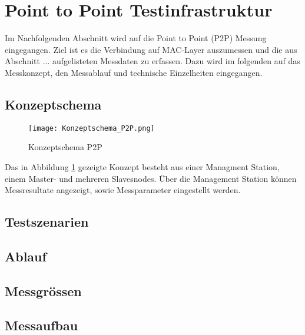 \clearpage
\section{Point to Point Testinfrastruktur}\label{sec:PointtoPointTestinfrastruktur}

Im Nachfolgenden Abschnitt wird auf die Point to Point (P2P) Messung eingegangen. Ziel ist es die Verbindung auf MAC-Layer auszumessen und die aus Abschnitt ... aufgelisteten Messdaten zu erfassen. Dazu wird im folgenden auf das Messkonzept, den Messablauf und technische Einzelheiten eingegangen. 

\subsection{Konzeptschema}\label{sec:KonzeptschemaP2P}

\begin{figure} [H]
	\centering
	\texttt{[image: Konzeptschema\_P2P.png]}
	\caption{Konzeptschema P2P}
	\label{fig:KonzeptschemaP2P}
\end{figure}

Das in Abbildung \ref{fig:KonzeptschemaP2P} gezeigte Konzept besteht aus einer Managment Station, einem Master- und mehreren Slavesnodes. Über die Management Station können Messresultate angezeigt, sowie Messparameter eingestellt werden.  

\subsection{Testszenarien}\label{sec:TestszenarienP2P}

\subsection{Ablauf}\label{sec:AblaufP2P}

\subsection{Messgrössen}\label{sec:MessgrössenP2P}

\subsection{Messaufbau}\label{sec:Messaufbau}

